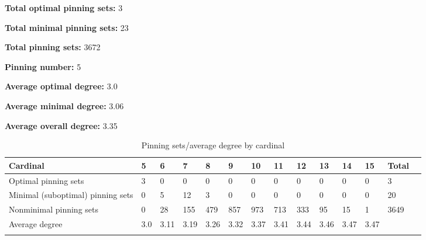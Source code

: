 \documentclass{article}%
\begin{document}
\begin{multicols}{2}
{\normalsize \noindent\textbf{Total optimal pinning sets:} 3

\noindent\textbf{Total minimal pinning sets:} 23

\noindent\textbf{Total pinning sets:} 3672

\noindent\textbf{Pinning number:} 5

}
\columnbreak

{\normalsize \noindent\textbf{Average optimal degree:} 3.0

\noindent\textbf{Average minimal degree:} 3.06

\noindent\textbf{Average overall degree:} 3.35

}
\end{multicols}

\begin{table}[ht]
	\caption{Pinning sets/average degree by cardinal}
	\centering
	\renewcommand{\arraystretch}{1.5}
	\begin{tabularx}{\textwidth}{lXXXXXXXXXXXXX}
		\toprule
			Cardinal & 5 & 6 & 7 & 8 & 9 & 10 & 11 & 12 & 13 & 14 & 15 & Total\\
			\hline
			Optimal pinning sets & 3 & 0 & 0 & 0 & 0 & 0 & 0 & 0 & 0 & 0 & 0 & 3 \\
			Minimal (suboptimal) pinning sets & 0 & 5 & 12 & 3 & 0 & 0 & 0 & 0 & 0 & 0 & 0 & 20 \\
			Nonminimal pinning sets & 0 & 28 & 155 & 479 & 857 & 973 & 713 & 333 & 95 & 15 & 1 & 3649 \\
			Average degree & 3.0 & 3.11 & 3.19 & 3.26 & 3.32 & 3.37 & 3.41 & 3.44 & 3.46 & 3.47 & 3.47 &  \\
		\bottomrule \\ 
	\end{tabularx}
\end{table}
\end{document}
